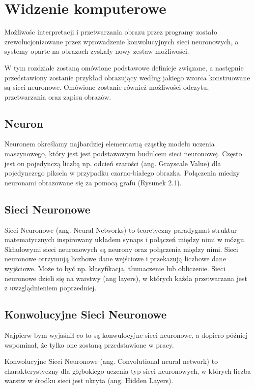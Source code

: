 \documentclass[brudnopis]{xmgr}
\begin{document}
\chapter{Widzenie komputerowe  }

Możliwośc interpretacji i przetwarzania obrazu przez programy zostało zrewolucjonizowane
przez wprowadzenie konwolucyjnych sieci neuronowych, a systemy oparte na obrazach zyskały nowy zestaw możliwości. 

W tym rozdziale zostaną omówione podstawowe definicje związane, a następnie przedstawiony zostanie przykład obrazujący według jakiego wzorca konstruowane są sieci neuronowe. Omówione zostanie również 
możliwości odczytu, przetwarzania oraz zapisu obrazów.

\section{Neuron  \label{s:dsssl}}

Neuronem określamy najbardziej elementarną cząstkę modelu uczenia maszynowego, który jest jest podstawowym budulcem sieci neuronowej. Często jest on pojedynczą liczbą np. odcień szarości (ang. Grayscale Value) dla pojedynczego piksela w przypadku czarno-białego obrazka. Połączenia miedzy neuronami obrazowane się za pomocą grafu (Rysunek 2.1).

\section{Sieci Neuronowe   \label{s:dsssl}}

Sieci Neuronowe (ang. Neural Networks) to teoretyczny paradygmat struktur matematycznych inspirowany układem synaps i połączeń między nimi w mózgu. Składowymi sieci neuronowych są neurony oraz połączenia między nimi. Sieci neuronowe otrzymują liczbowe dane wejściowe i przekazują liczbowe dane wyjściowe. Może to być np. klasyfikacja, tłumaczenie lub obliczenie. Sieci neuronowe dzieli się na warstwy (ang layers), w których każda przetwarzana jest z uwzglądnieniem poprzedniej.

\section{Konwolucyjne Sieci Neuronowe  \label{s:dsssl}}

Najpierw bym wyjaśnił co to są konwulocyjne sieci neuronowe, a dopiero później wspominał, że tylko one zostaną przedstawione w pracy.

Konwolucyjne Sieci Neuronowe (ang. Convolutional neural network) to charakterystyczny dla głębokiego uczenia typ sieci neuronowych, w których liczba warstw w środku sieci jest ukryta (ang. Hidden Layers).
\end{document}
